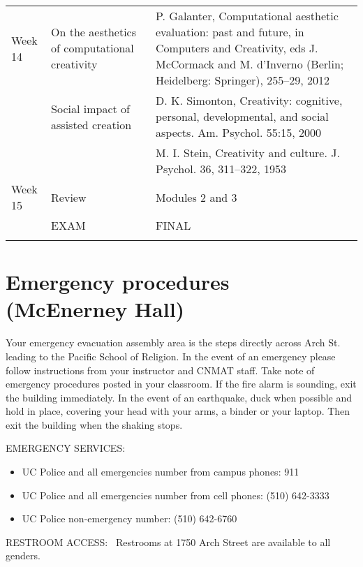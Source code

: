 \documentclass[letterpaper]{inzane_syllabus} %
\begin{document}
\begin{center}
\begin{tabularx}{\textwidth}{p{2cm}p{8cm} @{\hskip 0.5cm} p{9.5cm}}
Week 14 & On the aesthetics of computational creativity & P. Galanter, Computational aesthetic evaluation: past and future, in Computers and Creativity, eds J. McCormack and M. d’Inverno (Berlin; Heidelberg: Springer), 255–29, 2012  \\

& Social impact of assisted creation & D. K. Simonton, Creativity: cognitive, personal, developmental, and social aspects. Am. Psychol. 55:15, 2000 \\
& & M. I. Stein, Creativity and culture. J. Psychol. 36, 311–322, 1953 \\
\arrayrulecolor{maingray}\hline

Week 15 & Review & Modules 2 and 3\\

& EXAM & FINAL \\
\arrayrulecolor{myCOLOR}\hline
\hline 
\hline 
\hline 
\end{tabularx}
\end{center}


\vspace{0.5cm}
\section{Emergency procedures (McEnerney Hall)}

Your emergency evacuation assembly area is the steps directly across Arch St. leading to the Pacific School of Religion.
In the event of an emergency please follow instructions from your instructor and CNMAT staff.
Take note of emergency procedures posted in your classroom. If the fire alarm is sounding, exit the building immediately. In the event of an earthquake, duck when possible and hold in place, covering your head with your arms, a binder or your laptop. Then exit the building when the shaking stops.

EMERGENCY SERVICES:
\begin{itemize}
\item UC Police and all emergencies number from campus phones: 911
\item UC Police and all emergencies number from cell phones: (510) 642-3333
\item UC Police non-emergency number: (510) 642-6760
\end{itemize}
RESTROOM ACCESS: 
Restrooms at 1750 Arch Street are available to all genders.
\end{document}
